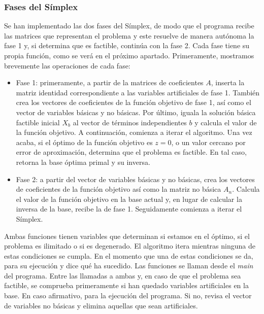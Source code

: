 \documentclass[12pt, titlepage]{article}
\begin{document}
\subsubsection{Fases del Símplex}
Se han implementado las dos fases del Símplex, de modo que el programa recibe las matrices que representan el problema y este resuelve de manera autónoma la fase 1 y, si determina que es factible, continúa con la fase 2. Cada fase tiene su propia función, como se verá en el próximo apartado. Primeramente, mostramos brevemente las operaciones de cada fase:
\begin{itemize}
\item	Fase 1: primeramente, a partir de la matrices de coeficientes $A$, inserta la matriz identidad correspondiente a las variables artificiales de fase 1. También crea los vectores de coeficientes de la función objetivo de fase 1, así como el vector de variables básicas y no básicas. Por último, iguala la solución básica factible inicial $X_b$ al vector de términos independientes $b$ y calcula el valor de la función objetivo. A continuación, comienza a iterar el algoritmo. Una vez acaba, si el óptimo de la función objetivo es $z = 0$, o un valor cercano por error de aproximación, determina que el problema es factible. En tal caso, retorna la base óptima primal y su inversa. 
\item	Fase 2: a partir del vector de variables básicas y no básicas, crea los vectores de coeficientes de la función objetivo así como la matriz no básica $A_n$. Calcula el valor de la función objetivo en la base actual y, en lugar de calcular la inversa de la base, recibe la de fase 1. Seguidamente comienza a iterar el Símplex.
\end{itemize}
Ambas funciones tienen variables que determinan si estamos en el óptimo, si el problema es ilimitado o si es degenerado. El algoritmo itera mientras ninguna de estas condiciones se cumpla. En el momento que una de estas condiciones se da, para su ejecución y dice qué ha sucedido.
Las funciones se llaman desde el \textit{main} del programa. Entre las llamadas a ambas y, en caso de que el problema sea factible, se comprueba primeramente si han quedado variables artificiales en la base. En caso afirmativo, para la ejecución del programa. Si no, revisa el vector de variables no básicas y elimina aquellas que sean artificiales.
\end{document}
